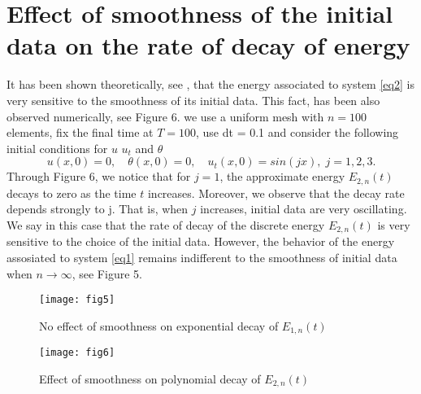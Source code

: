 \documentclass [reqno]{amsart}
\begin{document}
\section*{\bf Effect of smoothness of the initial data on the rate of decay of energy} 
It has been shown theoretically, see \cite{BEPS2006, BT2010}, that the energy associated to system \eqref{eq2} is very sensitive to the smoothness of its initial data. This fact, has been also observed numerically, see Figure 6. 
we use a uniform mesh with $n = 100$ elements, fix the final time at $T = 100$, use dt = 0.1 and consider the following initial conditions for $u$ $u_t$ and $\theta$
\[
u(x,0) = 0,\quad \theta(x, 0) = 0,\quad u_t(x, 0) =sin(jx),\; j = 1, 2, 3.
\]
Through Figure 6, we notice that for $j = 1$, the approximate energy $E_{2,n}(t)$ decays to zero as the time $t$ increases. Moreover, we observe that the decay rate depends strongly to j. That is, when $j$ increases, initial data are very oscillating. We say in this case that the rate of decay of the discrete energy $E_{2,n}(t)$ is very sensitive to
the choice of the initial data. However, the behavior of the energy assosiated to system \eqref{eq1} remains indifferent to the smoothness of initial data when $n\to\infty$, see Figure 5.
\begin{figure}[H]
\begin{center}
\texttt{[image: fig5]}
\caption{No effect of smoothness on exponential decay of $E_{1,n}(t)$}
\end{center}
\end{figure}
\begin{figure}[H]
\begin{center}
\texttt{[image: fig6]}
\caption{Effect of smoothness on polynomial decay of $E_{2,n}(t)$}
\end{center}
\end{figure}
\end{document}
